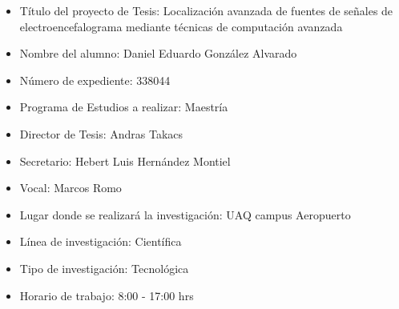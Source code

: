 \begin{itemize}
	\item Título del proyecto de Tesis: Localización avanzada de fuentes de señales de electroencefalograma mediante técnicas de computación avanzada 
	\item Nombre del alumno: Daniel Eduardo González Alvarado
	\item Número de expediente: 338044
	\item Programa de Estudios a realizar: Maestría
	\item Director de Tesis: Andras Takacs
	\item Secretario: Hebert Luis Hernández Montiel
	\item Vocal: Marcos Romo
	\item Lugar donde se realizará la investigación: UAQ campus Aeropuerto
	\item Línea de investigación: Científica
	\item Tipo de investigación: Tecnológica 
	\item Horario de trabajo: 8:00 - 17:00 hrs
\end{itemize}